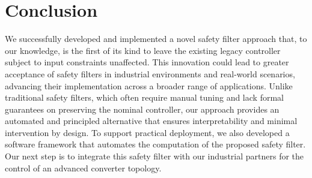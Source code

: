\documentclass[lettersize,journal]{IEEEtran}
\newcommand{\afterReviewChangedBox}[1]{{\color{orange}#1}}
\begin{document}






\section{Conclusion} \label{sec:conclusion}

We successfully developed and implemented a novel safety filter approach that, to our knowledge, is the first of its kind to leave the existing legacy controller subject to input constraints unaffected.
This innovation could lead to greater acceptance of safety filters in industrial environments and real-world scenarios, advancing their implementation across a broader range of applications.
\afterReviewChangedBox{Unlike traditional safety filters, which often require manual tuning and lack formal guarantees on preserving the nominal controller, our approach provides an automated and principled alternative that ensures interpretability and minimal intervention by design.
To support practical deployment, we also developed a software framework that automates the computation of the proposed safety filter.}
Our next step is to integrate this safety filter with our industrial partners for the control of an advanced converter topology.






\end{document}
